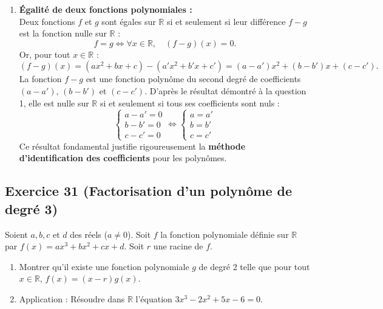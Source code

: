 \documentclass[11pt,a4paper]{article}
\begin{document}
\begin{correctionbox}
\begin{enumerate}
    \item \textbf{Égalité de deux fonctions polynomiales :}\\
    Deux fonctions $f$ et $g$ sont égales sur $\mathbb{R}$ si et seulement si leur différence $f - g$ est la fonction nulle sur $\mathbb{R}$ :
    \[
    f = g \iff \forall x \in \mathbb{R}, \quad (f - g)(x) = 0.
    \]
    Or, pour tout $x \in \mathbb{R}$ :
    \[
    (f - g)(x) = (ax^2 + bx + c) - (a'x^2 + b'x + c') = (a - a')x^2 + (b - b')x + (c - c').
    \]
    La fonction $f - g$ est une fonction polynôme du second degré de coefficients $(a - a')$, $(b - b')$ et $(c - c')$. D'après le résultat démontré à la question 1, elle est nulle sur $\mathbb{R}$ si et seulement si tous ses coefficients sont nuls :
    \[
    \begin{cases}
    a - a' = 0 \\
    b - b' = 0 \\
    c - c' = 0
    \end{cases}
    \iff
    \begin{cases}
    a = a' \\
    b = b' \\
    c = c'
    \end{cases}
    \]
    Ce résultat fondamental justifie rigoureusement la \textbf{méthode d'identification des coefficients} pour les polynômes.
\end{enumerate}
\end{correctionbox}

\subsection*{Exercice 31 (Factorisation d'un polynôme de degré 3)}
Soient $a, b, c$ et $d$ des réels ($a \neq 0$).
Soit $f$ la fonction polynomiale définie sur $\mathbb{R}$ par $f(x) = ax^3 + bx^2 + cx + d$. Soit $r$ une racine de $f$.
\begin{enumerate}
    \item Montrer qu'il existe une fonction polynomiale $g$ de degré 2 telle que pour tout $x \in \mathbb{R}$, $f(x) = (x - r)g(x)$.
    \item Application : Résoudre dans $\mathbb{R}$ l'équation $3x^3 - 2x^2 + 5x - 6 = 0$.
\end{enumerate}
\end{document}
